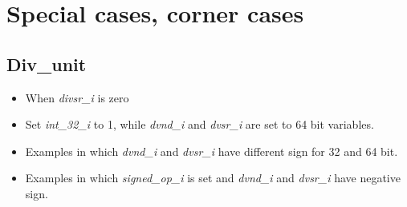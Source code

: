 \section{Special cases, corner cases}

\subsection{Div\_unit}

\begin{itemize}
  \item When \emph{divsr\_i} is zero
  \item Set \emph{int\_32\_i} to 1, while \emph{dvnd\_i} and \emph{dvsr\_i} are set to 64 bit variables.
  \item Examples in which  \emph{dvnd\_i} and \emph{dvsr\_i} have different sign for 32 and 64 bit.
  \item Examples in which \emph{signed\_op\_i} is set and \emph{dvnd\_i} and \emph{dvsr\_i} have negative sign.
\end{itemize}
